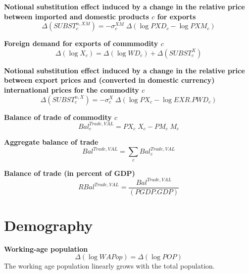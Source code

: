 \documentclass[12pt]{article}
\numberwithin{equation}{section}
\begin{document}
\noindent\textbf{Notional substitution effect induced by a change in the relative price between imported and domestic products $c$ for exports} \\
\begin{dmath}
\varDelta \left(SUBST^{n,XM}_{c}\right) = -\sigma^{XM}_{c} \; \varDelta \left(\operatorname{log} PXD_{c} - \operatorname{log} PXM_{c}\right)
\end{dmath}

\noindent\textbf{Foreign demand for exports of commmodity $c$} \\
\begin{dmath}
\varDelta \left(\operatorname{log} X_{c}\right) = \varDelta \left(\operatorname{log} WD_{c}\right) + \varDelta \left(SUBST^{X}_{c}\right)
\end{dmath}

\noindent\textbf{Notional substitution effect induced by a change in the relative price between export prices and (converted in domestic currency) international prices for the commodity $c$} \\
\begin{dmath}
\varDelta \left(SUBST^{n,X}_{c}\right) = -\sigma^{X}_{c} \; \varDelta \left(\operatorname{log} PX_{c} - \operatorname{log} EXR . PWD_{c}\right)
\end{dmath}

\noindent\textbf{Balance of trade of commodity $c$} \\
\begin{dmath}
Bal^{Trade,VAL}_{c} = PX_{c} \; X_{c} - PM_{c} \; M_{c}
\end{dmath}

\noindent\textbf{Aggregate balance of trade} \\
\begin{dmath}
Bal^{Trade,VAL} = \sum_{c} Bal^{Trade,VAL}_{c}
\end{dmath}

\noindent\textbf{Balance of trade (in percent of GDP)} \\
\begin{dmath}
RBal^{Trade,VAL} = \frac{Bal^{Trade,VAL}}{\left( PGDP . GDP \right)}
\end{dmath}


\section{Demography}



\noindent\textbf{Working-age population} \\
\begin{dmath}
\varDelta \left(\operatorname{log} WAPop\right) = \varDelta \left(\operatorname{log} POP\right)
\end{dmath}
The working age population linearly grows with the total population. \\
\end{document}
